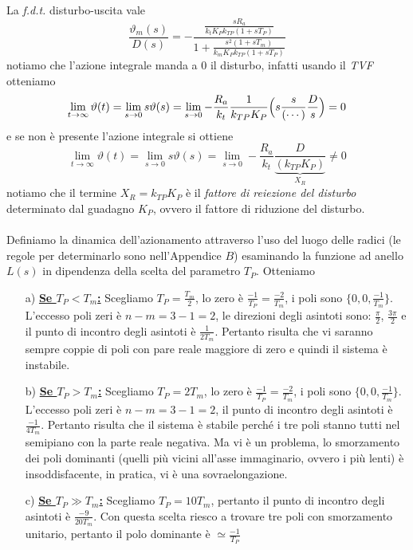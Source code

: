 La \emph{f.d.t.} disturbo-uscita vale
\begin{equation}
	\frac{\vartheta_m(s)}{D(s)} = - \frac{\frac{sR_a}{k_tK_Pk_{TP}(1+sT_P)}}{1+\frac{s^2(1+sT_m)}{k_mK_Pk_{TP}(1+sT_P)}}
\end{equation}
notiamo che l'azione integrale manda a $0$ il disturbo, infatti usando il \emph{TVF} otteniamo
\begin{equation*}
	\lim_{t \rightarrow \infty} \vartheta(t) = \lim_{s \rightarrow 0} s \vartheta(s) = \lim_{s \rightarrow 0} - \frac{R_a}{k_t} \frac{1}{k_{TP}K_P} \Bigl( s \frac{s}{(\cdots)} \frac{D}{s} \Bigr) = 0
\end{equation*} 
e se non è presente l'azione integrale si ottiene 
\begin{equation*}
	\lim_{t \rightarrow \infty} \vartheta(t) = \lim_{s \rightarrow 0} s \vartheta(s) = \lim_{s \rightarrow 0}  - \frac{R_a}{k_t} \frac{D}{\underbrace{(k_{TP}K_P)}_{X_R}} \neq 0
\end{equation*}
notiamo che il termine $X_R = k_{TP}K_P$ è il \emph{fattore di reiezione del disturbo} determinato dal guadagno $K_P$, ovvero il fattore di riduzione del disturbo. 

\paragraph{}
Definiamo la dinamica dell'azionamento attraverso l'uso del luogo delle radici (le regole per determinarlo sono nell'Appendice $B$) esaminando la funzione ad anello $L(s)$ in dipendenza della scelta del parametro $T_P$. Otteniamo
\begin{itemize}
	\item[a)] \textbf{\underline{Se $T_P < T_m$:}} Scegliamo $T_P = \frac{T_m}{2}$, lo zero è $\frac{-1}{T_P}=\frac{-2}{T_m}$, i poli sono $\lbrace 0, 0, \frac{-1}{T_m} \rbrace$. L'eccesso poli zeri è $n-m=3-1=2$, le direzioni degli asintoti sono: $\frac{\pi}{2}$, $\frac{3 \pi}{2}$ e il punto di incontro degli asintoti è $\frac{1}{2 T_m}$. Pertanto risulta che vi saranno sempre coppie di poli con pare reale maggiore di zero e quindi il sistema è instabile.
	\item[b)] \textbf{\underline{Se $T_P > T_m$:}} Scegliamo $T_P = 2T_m$, lo zero è $\frac{-1}{T_P}=\frac{-2}{T_m}$, i poli sono $\lbrace 0, 0, \frac{-1}{T_m} \rbrace$. L'eccesso poli zeri è $n-m=3-1=2$, il punto di incontro degli asintoti è $\frac{-1}{4 T_m}$. Pertanto risulta che il sistema è stabile perché i tre poli stanno tutti nel semipiano con la parte reale negativa. Ma vi è un problema, lo smorzamento dei poli dominanti (quelli più vicini all'asse immaginario, ovvero i più lenti) è insoddisfacente, in pratica, vi è una sovraelongazione.
	\item[c)] \textbf{\underline{Se $T_P \gg T_m$:}} Scegliamo $T_P = 10 T_m$, pertanto il punto di incontro degli asintoti è $\frac{-9}{20 T_m}$. Con questa scelta riesco a trovare tre poli con smorzamento unitario, pertanto il polo dominante è $ \simeq \frac{-1}{T_P}$
\end{itemize}

